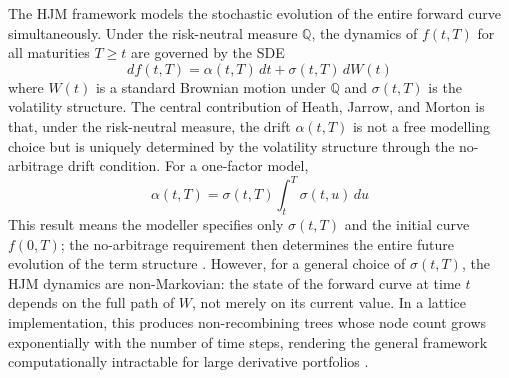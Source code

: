     \noindent
    The HJM framework models the stochastic evolution of the entire forward curve simultaneously. Under the risk-neutral measure $\mathbb{Q}$, the dynamics of $f(t,T)$ for all maturities $T \geq t$ are governed by the SDE
    \begin{equation}
        df(t,T) = \alpha(t,T)\,dt + \sigma(t,T)\,dW(t)
    \end{equation}
    where $W(t)$ is a standard Brownian motion under $\mathbb{Q}$ and $\sigma(t,T)$ is the volatility structure. The central contribution of Heath, Jarrow, and Morton is that, under the risk-neutral measure, the drift $\alpha(t,T)$ is not a free modelling choice but is uniquely determined by the volatility structure through the no-arbitrage drift condition. For a one-factor model,
    \begin{equation}
        \alpha(t,T) = \sigma(t,T)\int_t^T \sigma(t,u)\,du
    \end{equation}
    This result means the modeller specifies only $\sigma(t,T)$ and the initial curve $f(0,T)$; the no-arbitrage requirement then determines the entire future evolution of the term structure \cite{kwok2008mathematical}. However, for a general choice of $\sigma(t,T)$, the HJM dynamics are non-Markovian: the state of the forward curve at time $t$ depends on the full path of $W$, not merely on its current value. In a lattice implementation, this produces non-recombining trees whose node count grows exponentially with the number of time steps, rendering the general framework computationally intractable for large derivative portfolios \cite{Green_2016, Hull_2018}.

